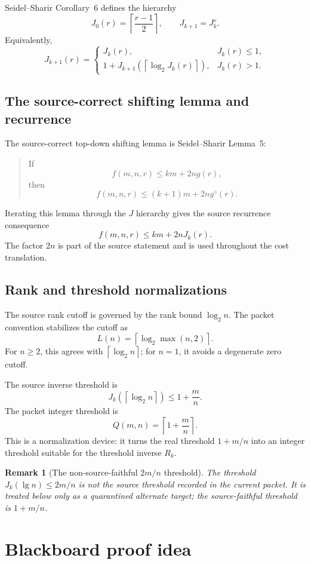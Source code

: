 ﻿\documentclass[11pt]{article}
\newtheorem{remark}[theorem]{Remark}
\newcommand{\ceil}[1]{\left\lceil #1 \right\rceil}
\begin{document}
Seidel--Sharir Corollary~6 defines the hierarchy
\[
J_0(r)=\ceil{\frac{r-1}{2}},
\qquad
J_{k+1}=J_k^\diamond.
\]
Equivalently,
\[
J_{k+1}(r)=
\begin{cases}
J_k(r),&J_k(r)\le 1,\\[4pt]
1+J_{k+1}(\ceil{\log_2 J_k(r)}),&J_k(r)>1.
\end{cases}
\]

\subsection{The source-correct shifting lemma and recurrence}

The source-correct top-down shifting lemma is Seidel--Sharir Lemma~5:
\begin{quote}
If
\[
f(m,n,r)\le km+2n g(r),
\]
then
\[
f(m,n,r)\le (k+1)m+2n g^\diamond(r).
\]
\end{quote}
Iterating this lemma through the $J$ hierarchy gives the source recurrence consequence
\[
f(m,n,r)\le km+2nJ_k(r).
\]
The factor $2n$ is part of the source statement and is used throughout the cost translation.

\subsection{Rank and threshold normalizations}

The source rank cutoff is governed by the rank bound $\log_2 n$.  The packet convention stabilizes the cutoff as
\[
L(n)=\ceil{\log_2\max(n,2)}.
\]
For $n\ge 2$, this agrees with $\ceil{\log_2 n}$; for $n=1$, it avoids a degenerate zero cutoff.

The source inverse threshold is
\[
J_k(\ceil{\log_2 n})\le 1+\frac mn.
\]
The packet integer threshold is
\[
Q(m,n)=\ceil{1+\frac mn}.
\]
This is a normalization device: it turns the real threshold $1+m/n$ into an integer threshold suitable for the threshold inverse $R_k$.

\begin{remark}[The non-source-faithful $2m/n$ threshold]
The threshold $J_k(\lg n)\le 2m/n$ is not the source threshold recorded in the current packet.  It is treated below only as a quarantined alternate target; the source-faithful threshold is $1+m/n$.
\end{remark}

\section{Blackboard proof idea}
\end{document}
